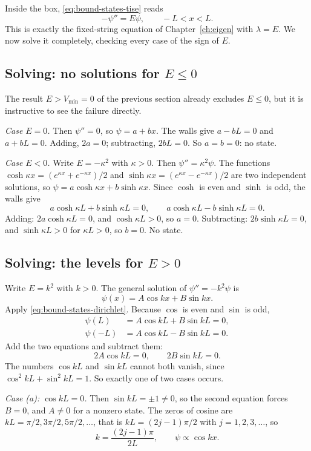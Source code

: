 Inside the box, \cref{eq:bound-states-tise} reads
\begin{equation}
-\psi''=E\psi,\qquad -L<x<L.
\label{eq:bound-states-boxeq}
\end{equation}
This is exactly the fixed-string equation of Chapter~\ref{ch:eigen} with $\lambda=E$. We now solve it completely, checking every case of the sign of $E$.

\subsection{Solving: no solutions for $E\le 0$}

The result $E>V_{\min}=0$ of the previous section already excludes $E\le0$, but it is instructive to see the failure directly.

\emph{Case $E=0$.} Then $\psi''=0$, so $\psi=a+bx$. The walls give $a-bL=0$ and $a+bL=0$. Adding, $2a=0$; subtracting, $2bL=0$. So $a=b=0$: no state.

\emph{Case $E<0$.} Write $E=-\kappa^2$ with $\kappa>0$. Then $\psi''=\kappa^2\psi$. The functions $\cosh\kappa x=(e^{\kappa x}+e^{-\kappa x})/2$ and $\sinh\kappa x=(e^{\kappa x}-e^{-\kappa x})/2$ are two independent solutions, so $\psi=a\cosh\kappa x+b\sinh\kappa x$. Since $\cosh$ is even and $\sinh$ is odd, the walls give
\[
a\cosh\kappa L+b\sinh\kappa L=0,\qquad a\cosh\kappa L-b\sinh\kappa L=0 .
\]
Adding: $2a\cosh\kappa L=0$, and $\cosh\kappa L>0$, so $a=0$. Subtracting: $2b\sinh\kappa L=0$, and $\sinh\kappa L>0$ for $\kappa L>0$, so $b=0$. No state.

\subsection{Solving: the levels for $E>0$}

Write $E=k^2$ with $k>0$. The general solution of $\psi''=-k^2\psi$ is
\[
\psi(x)=A\cos kx+B\sin kx .
\]
Apply \cref{eq:bound-states-dirichlet}. Because $\cos$ is even and $\sin$ is odd,
\begin{align}
\psi(L)&=A\cos kL+B\sin kL=0,\label{eq:bound-states-bc1}\\
\psi(-L)&=A\cos kL-B\sin kL=0.\label{eq:bound-states-bc2}
\end{align}
Add the two equations and subtract them:
\[
2A\cos kL=0,\qquad 2B\sin kL=0 .
\]
The numbers $\cos kL$ and $\sin kL$ cannot both vanish, since $\cos^2kL+\sin^2kL=1$. So exactly one of two cases occurs.

\emph{Case (a): $\cos kL=0$.} Then $\sin kL=\pm1\ne0$, so the second equation forces $B=0$, and $A\ne0$ for a nonzero state. The zeros of cosine are $kL=\pi/2,3\pi/2,5\pi/2,\dots$, that is $kL=(2j-1)\pi/2$ with $j=1,2,3,\dots$, so
\[
k=\frac{(2j-1)\pi}{2L},\qquad \psi\propto\cos kx .
\]

